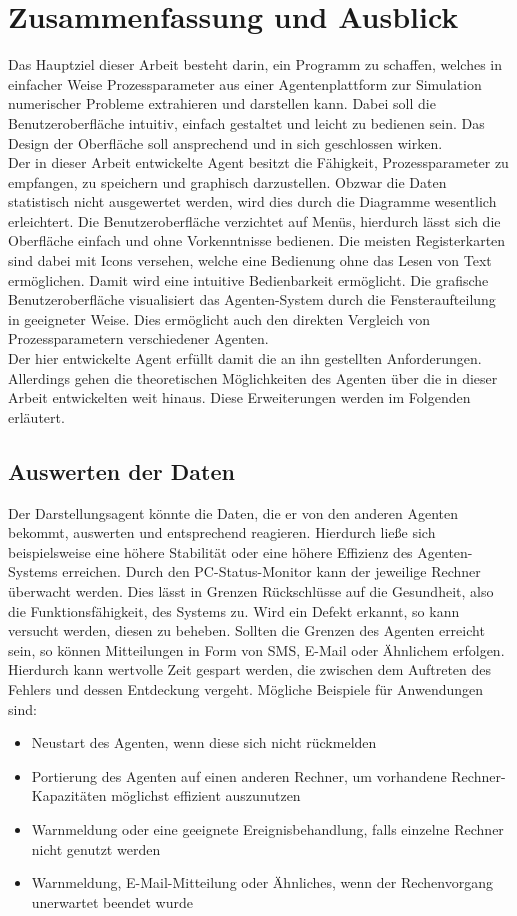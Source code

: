 \documentclass[a4paper,12pt,oneside,openright,onecolumn,final,titlepage,fleqn,ngerman]{scrreprt}
\newcommand{\parag}{\\[2ex]}
\newcommand{\repag}{Darstellungsagent}
\begin{document}
	\chapter{Zusammenfassung und Ausblick}\label{kap_ausblick}
	Das Hauptziel dieser Arbeit besteht darin, ein Programm zu schaffen, welches in einfacher Weise Prozessparameter aus einer Agentenplattform zur Simulation numerischer Probleme extrahieren und darstellen kann. Dabei soll die Benutzeroberfläche intuitiv, einfach gestaltet und leicht zu bedienen sein. Das Design der Oberfläche soll ansprechend und in sich geschlossen wirken.\parag{}
	Der in dieser Arbeit entwickelte Agent besitzt die Fähigkeit, Prozessparameter zu empfangen, zu speichern und graphisch darzustellen. Obzwar die Daten statistisch nicht ausgewertet werden, wird dies durch die Diagramme wesentlich erleichtert. Die Benutzeroberfläche verzichtet auf Menüs, hierdurch lässt sich die Oberfläche einfach und ohne Vorkenntnisse bedienen. Die meisten Registerkarten sind dabei mit Icons versehen, welche eine Bedienung ohne das Lesen von Text ermöglichen. Damit wird eine intuitive Bedienbarkeit ermöglicht. Die grafische Benutzeroberfläche visualisiert das Agenten-System durch die Fensteraufteilung in geeigneter Weise. Dies ermöglicht auch den direkten Vergleich von Prozessparametern verschiedener Agenten.\parag{}
	Der hier entwickelte Agent erfüllt damit die an ihn gestellten Anforderungen. Allerdings gehen die theoretischen Möglichkeiten des Agenten über die in dieser Arbeit entwickelten weit hinaus. Diese Erweiterungen werden im Folgenden erläutert.

	\section{Auswerten der Daten}
	Der \repag{} könnte die Daten, die er von den anderen Agenten bekommt, auswerten und entsprechend reagieren. Hierdurch ließe sich beispielsweise eine höhere Stabilität oder eine höhere Effizienz des Agenten-Systems erreichen. Durch den PC-Status-Monitor kann der jeweilige Rechner überwacht werden. Dies lässt in Grenzen Rückschlüsse auf die \glqq{}Gesundheit\grqq{}, also die Funktionsfähigkeit, des Systems zu. Wird ein Defekt erkannt, so kann versucht werden, diesen zu beheben. Sollten die Grenzen des Agenten erreicht sein, so können Mitteilungen in Form von SMS, E-Mail oder Ähnlichem erfolgen. Hierdurch kann wertvolle Zeit gespart werden, die zwischen dem Auftreten des Fehlers und dessen Entdeckung vergeht. Mögliche Beispiele für Anwendungen sind:
	\begin{itemize}
		\item Neustart des Agenten, wenn diese sich nicht rückmelden
		\item Portierung des Agenten auf einen anderen Rechner, um vorhandene Rech\-ner-Ka\-pa\-zi\-tät\-en möglichst effizient auszunutzen
		\item Warnmeldung oder eine geeignete Ereignisbehandlung, falls einzelne Rechner nicht genutzt werden
		\item Warnmeldung, E-Mail-Mitteilung oder Ähnliches, wenn der Rechenvorgang unerwartet beendet wurde
	\end{itemize}
\end{document}
